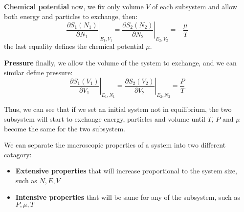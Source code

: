 \documentclass{article}
\begin{document}
\textbf{Chemical potential}
now, we fix only volume $V$ of each subsystem and allow both energy and particles to exchange, then:
\begin{equation}
    \left. \frac{\partial S_1(N_1)}{\partial N_1} \right|_{E_1,V_1} = \left. \frac{\partial S_2(N_2)}{\partial N_2}\right|_{E_2,V_2} = -\frac{\mu}{T}
\end{equation}
the last equality defines the chemical potential $\mu$. 

\textbf{Pressure}
finally, we allow the volume of the system to exchange, and we can similar define pressure:
\begin{equation}
    \left. \frac{\partial S_1(V_1)}{\partial V_1} \right|_{E_1,N_1} = \left. \frac{\partial S_2(V_2)}{\partial V_2}\right|_{E_2,N_2} = \frac{P}{T}
\end{equation}

Thus, we can see that if we set an initial system not in equilibrium, the two subsystem will
start to exchange energy, particles and volume until $T$, $P$ and $\mu$ become the same 
for the two subsystem. 

We can separate the macroscopic properties of a system into two different catagory:
\begin{itemize}
    \item \textbf{Extensive properties} that will increase proportional to the system size, such as $N,E,V$
    \item \textbf{Intensive properties} that will be same for any of the subsystem, such as  $P,\mu,T$
\end{itemize}
\end{document}

